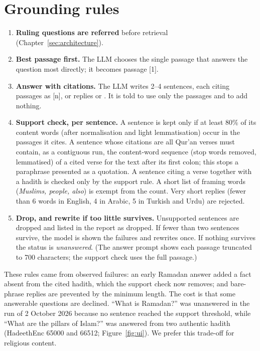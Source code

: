 \section{Grounding rules}
\label{sec:grounding}
\begin{enumerate}[leftmargin=*,itemsep=2pt]
  \item \textbf{Ruling questions are referred} before retrieval (Chapter~\ref{sec:architecture}).
  \item \textbf{Best passage first.} The LLM chooses the single passage that answers the question most directly; it
        becomes passage [1].
  \item \textbf{Answer with citations.} The LLM writes 2--4 sentences, each citing passages as [n], or replies
         or . It is told to use only the passages and to add nothing.
  \item \textbf{Support check, per sentence.} A sentence is kept only if at least 80\% of its content words
        (after normalisation and light lemmatisation) occur in the passages it cites.
        A sentence whose citations are all Qur'an verses must contain, as a contiguous run, the content-word sequence
        (stop words removed, lemmatised) of a cited verse for the text after its first colon; this stops a
        paraphrase presented as a quotation. A sentence citing a verse together with a hadith is checked only by
        the support rule. A short list of framing words (\emph{Muslims, people, also}) is exempt from the count.
        Very short replies (fewer than 6 words in English, 4 in Arabic, 5 in Turkish and Urdu) are rejected.
  \item \textbf{Drop, and rewrite if too little survives.} Unsupported sentences are dropped and listed in the
        report as dropped. If fewer than two sentences survive, the model is shown the failures
        and rewrites once. If nothing survives the status is \emph{unanswered}. (The answer prompt shows each
        passage truncated to 700 characters; the support check uses the full passage.)
\end{enumerate}
These rules came from observed failures: an early Ramadan answer added a fact absent from the cited hadith, which the
support check now removes; and bare-phrase replies are prevented by the minimum length. The cost is that some
answerable questions are declined. ``What is Ramadan?'' was unanswered in the run of 2 October 2026 because no sentence
reached the support threshold, while ``What are the pillars of Islam?'' was answered from two authentic hadith
(HadeethEnc 65000 and 66512; Figure~\ref{fig:ui}). We prefer this trade-off for religious content.

